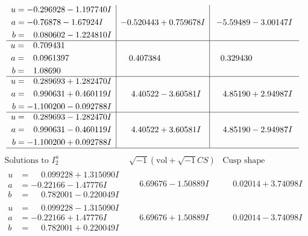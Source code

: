 \documentclass[1p]{elsarticle_modified}
\theoremstyle{definition}
\newcommand{\I}{\sqrt{-1}}
\begin{document}
$$\begin{array}{c|c|c}
\begin{aligned}
u &= -0.296928 - 1.197740 I \\
a &= -0.76878 - 1.67924 I \\
b &= \phantom{-}0.080602 - 1.224810 I\end{aligned}
 & -0.520443 + 0.759678 I & -5.59489 - 3.00147 I \\ \hline\begin{aligned}
u &= \phantom{-}0.709431\phantom{ +0.000000I} \\
a &= \phantom{-}0.0961397\phantom{ +0.000000I} \\
b &= \phantom{-}1.08690\phantom{ +0.000000I}\end{aligned}
 & \phantom{-}0.407384\phantom{ +0.000000I} & \phantom{-}0.329430\phantom{ +0.000000I} \\ \hline\begin{aligned}
u &= \phantom{-}0.289693 + 1.282470 I \\
a &= \phantom{-}0.990631 + 0.460119 I \\
b &= -1.100200 - 0.092788 I\end{aligned}
 & \phantom{-}4.40522 - 3.60581 I & \phantom{-}4.85190 + 2.94987 I \\ \hline\begin{aligned}
u &= \phantom{-}0.289693 - 1.282470 I \\
a &= \phantom{-}0.990631 - 0.460119 I \\
b &= -1.100200 + 0.092788 I\end{aligned}
 & \phantom{-}4.40522 + 3.60581 I & \phantom{-}4.85190 - 2.94987 I\\
 \hline 
 \end{array}$$\newpage$$\begin{array}{c|c|c}  
\text{Solutions to }I^u_{2}& \I (\text{vol} + \sqrt{-1}CS) & \text{Cusp shape}\\
 \hline 
\begin{aligned}
u &= \phantom{-}0.099228 + 1.315090 I \\
a &= -0.22166 - 1.47776 I \\
b &= \phantom{-}0.782001 - 0.220049 I\end{aligned}
 & \phantom{-}6.69676 - 1.50889 I & \phantom{-}0.02014 + 3.74098 I \\ \hline\begin{aligned}
u &= \phantom{-}0.099228 - 1.315090 I \\
a &= -0.22166 + 1.47776 I \\
b &= \phantom{-}0.782001 + 0.220049 I\end{aligned}
 & \phantom{-}6.69676 + 1.50889 I & \phantom{-}0.02014 - 3.74098 I \\ \hline\begin{aligned}

\end{aligned}
\end{array}$$
\end{document}
